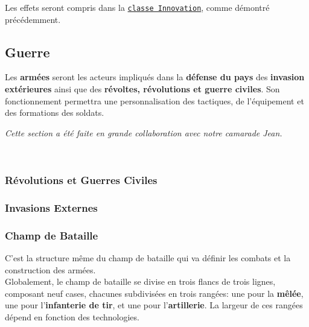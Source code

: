 \documentclass{article}
\newcommand{\ulcolor}[2][class]{\setulcolor{#1}\ul{#2}}
\newcommand{\ulcolor}[2][var]{\setulcolor{#1}\ul{#2}}
\newcommand{\ulcolor}[2][func]{\setulcolor{#1}\ul{#2}}
\newcommand*{\mybox}[2]{\colorbox{#1!30}{\parbox{.98\linewidth}{#2}}}
\newcommand\tab[1][0.5cm]{\hspace*{#1}}
\newcommand{\genbox}[1]{\mybox{verylightgray}{#1}}
\newcommand{\class}[1]{\texttt{\textcolor{codeColour}{\ulcolor[class]{#1}}}}
\begin{document}
                    \tab \genbox{
                        Les effets seront compris dans la \class{classe Innovation}, comme démontré précédemment.
                    }
                    
        
        \subsection{Guerre}
            Les \textbf{armées} seront les acteurs impliqués dans la \textbf{défense du pays} des \textbf{invasion extérieures} ainsi que des \textbf{révoltes, révolutions et guerre civiles}. Son fonctionnement permettra une personnalisation des tactiques, de l'équipement et des formations des soldats.\\
            \begin{center}
                \textit{Cette section a été faite en grande collaboration avec notre camarade Jean.}
            \end{center}\\
            
            \subsubsection{Révolutions et Guerres Civiles}

            \subsubsection{Invasions Externes}

            \subsubsection{Champ de Bataille}
                C'est la structure même du champ de bataille qui va définir les combats et la construction des armées.\\
                Globalement, le champ de bataille se divise en trois flancs de trois lignes, composant neuf cases, chacunes subdivisées en trois rangées: une pour la \textbf{mêlée}, une pour l'\textbf{infanterie de tir}, et une pour l'\textbf{artillerie}. La largeur de ces rangées dépend en fonction des technologies.
\end{document}
